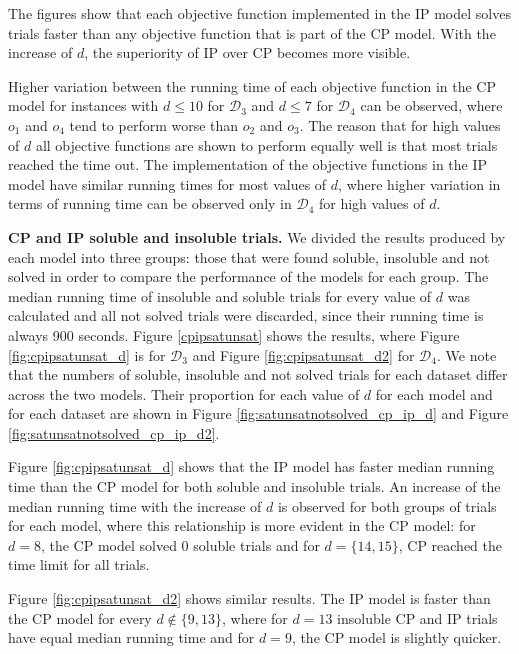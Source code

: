 \documentclass{mpaper}
\begin{document}
The figures show that each objective function implemented in the IP model solves trials faster than any objective function that is part of the CP model. With the increase of $d$, the superiority of IP over CP becomes more visible.

Higher variation between the running time of each objective function in the CP model for instances with $d \leq 10$ for $\mathcal{D}_3$ and $d \leq 7$ for $\mathcal{D}_4$ can be observed, where $o_1$ and $o_4$ tend to perform worse than $o_2$ and $o_3$. The reason that for high values of $d$ all objective functions are shown to perform equally well is that most trials reached the time out.
The implementation of the objective functions in the IP model have similar running times for most values of $d$, where higher variation in terms of running time can be observed only in $\mathcal{D}_4$ for high values of $d$.

\textbf{CP and IP soluble and insoluble trials.} We divided the results produced by each model into three groups: those that were found soluble, insoluble and not solved in order to compare the performance of the models for each group. The median running time of insoluble and soluble trials for every value of $d$ was calculated and all not solved trials were discarded, since their running time is always 900 seconds. Figure \ref{cpipsatunsat} shows the results, where Figure \ref{fig:cpipsatunsat_d} is for $\mathcal{D}_3$ and Figure \ref{fig:cpipsatunsat_d2} for $\mathcal{D}_4$. We note that the numbers of soluble, insoluble and not solved trials for each dataset differ across the two models. Their proportion for each value of $d$ for each model and for each dataset are shown in Figure \ref{fig:satunsatnotsolved_cp_ip_d} and Figure \ref{fig:satunsatnotsolved_cp_ip_d2}.

Figure \ref{fig:cpipsatunsat_d} shows that the IP model has faster median running time than the CP model for both soluble and insoluble trials. An increase of the median running time with the increase of $d$ is observed for both groups of trials for each model, where this relationship is more evident in the CP model: for $d = 8$, the CP model solved 0 soluble trials and for $d=\{14, 15\}$, CP reached the time limit for all trials.

Figure \ref{fig:cpipsatunsat_d2} shows similar results. The IP model is faster than the CP model for every $d \notin \{9,13\}$, where for $d = 13$ insoluble CP and IP trials have equal median running time and for $d=9$, the CP model is slightly quicker.
\end{document}
